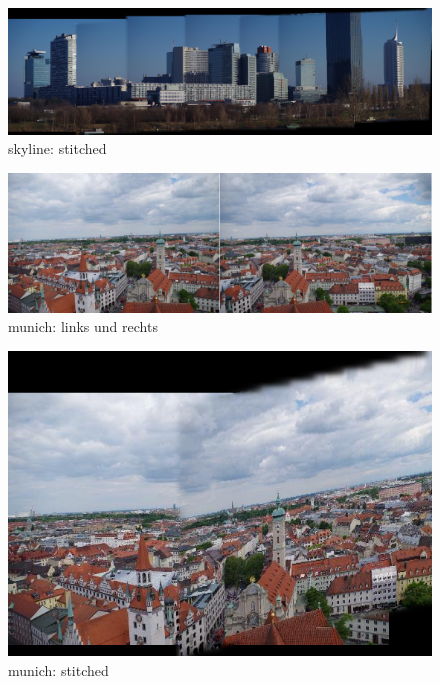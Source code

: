 \documentclass[deutsch]{scrartcl}
\begin{document}
\begin{figure}
\begin{center}
\includegraphics[width=1.0\textwidth]{skylineS.png}
\caption{skyline: stitched}
\label{fig:skylineS}
\end{center}
\end{figure}

\begin{figure}
\begin{center}
\includegraphics[width=1.0\textwidth]{munich.jpg}
\caption{munich: links und rechts}
\label{fig:munich}
\end{center}
\end{figure}

\begin{figure}
\begin{center}
\includegraphics[width=1.0\textwidth]{munichS.png}
\caption{munich: stitched}
\label{fig:munichS}
\end{center}
\end{figure}
\end{document}
